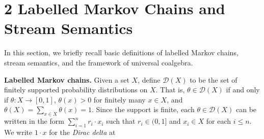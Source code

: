 \documentclass[11pt,a4paper]{amsart}
\begin{document}
%
\hypertarget{html:S2}{} \section*{2 Labelled Markov Chains and Stream Semantics}
\hypertarget{html:S2.p1}{} In this section, we briefly recall basic definitions of labelled Markov chains, stream semantics, and the framework of universal coalgebra.
\par\medskip
\hypertarget{html:S2.SS0.SSS0.P0.SPx1}{} \par\noindent\textbf{Labelled Markov chains.}\quad  %
\hypertarget{html:S2.SS0.SSS0.P0.SPx1.p1}{} Given a set %
\hypertarget{html:S2.SS0.SSS0.P0.SPx1.p1.m1}{}\({X}\), define %
\hypertarget{html:S2.SS0.SSS0.P0.SPx1.p1.m2}{}\({{\mathcal{D}}(X)}\) to be the set of finitely supported probability distributions on %
\hypertarget{html:S2.SS0.SSS0.P0.SPx1.p1.m3}{}\({X}\). That is, %
\hypertarget{html:S2.SS0.SSS0.P0.SPx1.p1.m4}{}\({\theta\in{\mathcal{D}}(X)}\) if and only if %
\hypertarget{html:S2.SS0.SSS0.P0.SPx1.p1.m5}{}\({\theta\colon X\to[0,1]}\), %
\hypertarget{html:S2.SS0.SSS0.P0.SPx1.p1.m6}{}\({\theta(x)>0}\) for finitely many %
\hypertarget{html:S2.SS0.SSS0.P0.SPx1.p1.m7}{}\({x\in X}\), and %
\hypertarget{html:S2.SS0.SSS0.P0.SPx1.p1.m8}{}\({\theta(X)=\sum_{x\in X}\theta(x)=1}\). Since the support is finite, each %
\hypertarget{html:S2.SS0.SSS0.P0.SPx1.p1.m9}{}\({\theta\in{\mathcal{D}}(X)}\) can be written in the form %
\hypertarget{html:S2.SS0.SSS0.P0.SPx1.p1.m10}{}\({\sum_{i=1}^{n}r_{i}\cdot x_{i}}\) such that %
\hypertarget{html:S2.SS0.SSS0.P0.SPx1.p1.m11}{}\({r_{i}\in(0,1]}\) and %
\hypertarget{html:S2.SS0.SSS0.P0.SPx1.p1.m12}{}\({x_{i}\in X}\) for each %
\hypertarget{html:S2.SS0.SSS0.P0.SPx1.p1.m13}{}\({i\leq n}\). We write %
\hypertarget{html:S2.SS0.SSS0.P0.SPx1.p1.m14}{}\({1\cdot x}\) for the \emph{Dirac delta} at %
\end{document}
